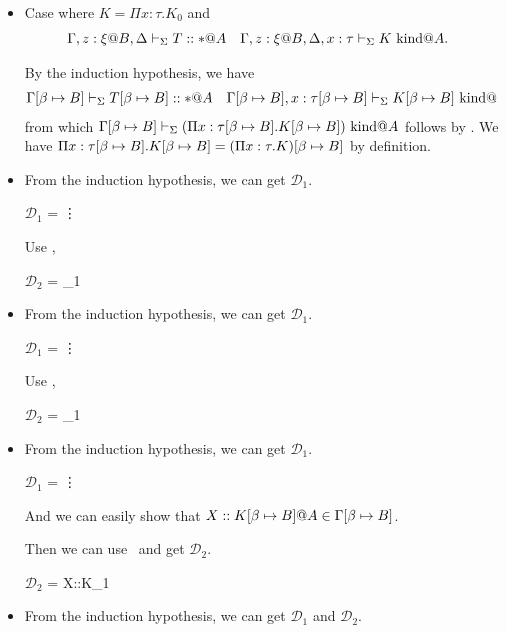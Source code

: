 \begin{itemize}
      \item[] Case \WAbs{} where $K = \Pi x:\tau.K_0$ and 
        \begin{align*}
          & \G, z:\xi@B, \D \V T::*@A && \G, z:\xi@B, \D, x:\tau \V K \iskind@A.
        \end{align*}


        By the induction hypothesis, we have
        \begin{align*}
	& \GGV T\SB::*@A && \GG, x:\tau\SB \V K\SB \iskind@
        \end{align*}
        from which $\Gamma[\beta \mapsto B] \vdash_\Sigma (\Pi x:\tau[\beta \mapsto B].K[\beta \mapsto B]) \text{\ kind} @A$ follows by \WAbs.
        We have $\Pi x:\tau[\beta \mapsto B].K[\beta \mapsto B] = (\Pi x:\tau.K)[\beta \mapsto B]$ by definition.
        
	\item \WCsp

	From the induction hypothesis, we can get $\mathcal{D}_1$.

	$\mathcal{D}_1$ = 
	{\vdots}

	Use \WCsp,

	$\mathcal{D}_2$ = 
	{_1}

	\item \WTW

	From the induction hypothesis, we can get $\mathcal{D}_1$.

	$\mathcal{D}_1$ = 
	{\vdots}

	Use \WTW,

	$\mathcal{D}_2$ = 
	{_1}

	\item \KVar

	From the induction hypothesis, we can get $\mathcal{D}_1$.

	$\mathcal{D}_1$ = 
	{\vdots}

	And we can easily show that $X::K\SB@A \in \GG$.

	Then we can use \KVar\ and get $\mathcal{D}_2$.

	$\mathcal{D}_2$ = 
	{X::K\SB@A \in \GG \andalso {}_1}

	\item \KAbs

	From the induction hypothesis, we can get $\mathcal{D}_1$ and $\mathcal{D}_2$.


\end{itemize}
